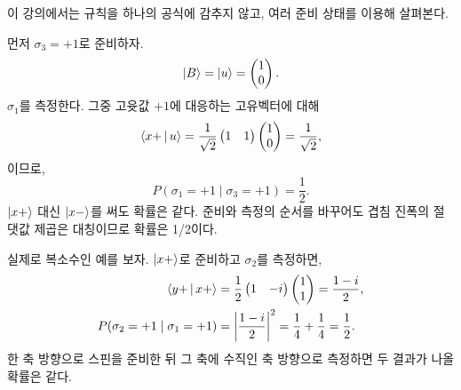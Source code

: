 \begin{classroomqa}\end{classroomqa}

\begin{classroomqa}\end{classroomqa}

이 강의에서는 규칙을 하나의 공식에 감추지 않고, 여러 준비 상태를 이용해 살펴본다.

먼저 \(\sigma_3=+1\)로 준비하자. \begin{equation}
  \left\lvert B\right\rangle=\left\lvert u\right\rangle=\begin{pmatrix}1\\0\end{pmatrix}.
\end{equation}\(\sigma_1\)를 측정한다. 그중 고윳값 \(+1\)에 대응하는 고유벡터에 대해 \begin{equation}
  \left\langle x+\,\middle|\,u\right\rangle
  =
  \frac{1}{\sqrt2}
  \begin{pmatrix}1&1\end{pmatrix}
  \begin{pmatrix}1\\0\end{pmatrix}
  =\frac{1}{\sqrt2},
\end{equation}이므로, \begin{equation}
  P(\sigma_1=+1\mid\sigma_3=+1)=\frac12.
\end{equation}\(\left\lvert x+\right\rangle\) 대신 \(\left\lvert x-\right\rangle\)를 써도 확률은 같다. 준비와 측정의 순서를 바꾸어도 겹침 진폭의 절댓값 제곱은 대칭이므로 확률은 1/2이다.

실제로 복소수인 예를 보자. \(\left\lvert x+\right\rangle\)로 준비하고 \(\sigma_2\)를 측정하면, \begin{align}
  \left\langle y+\,\middle|\,x+\right\rangle
  &=
  \frac12
  \begin{pmatrix}1&-i\end{pmatrix}
  \begin{pmatrix}1\\1\end{pmatrix}
  =\frac{1-i}{2},
  \notag\\
  P(\sigma_2=+1\mid\sigma_1=+1)
  &=\left|\frac{1-i}{2}\right|^2
  =\frac14+\frac14
  =\frac12.
  \label{eq:l03-complex-probability-example}
\end{align}한 축 방향으로 스핀을 준비한 뒤 그 축에 수직인 축 방향으로 측정하면 두 결과가 나올 확률은 같다.

